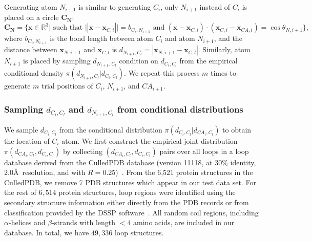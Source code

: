 Generating atom $N_{i+1}$ is similar to generating $C_i$, only
$N_{i+1}$ instead of $C_i$ is placed on a circle $\mathbf{C_N}$:
\begin{equation}
\label{eqn:circle-N} \mathbf{C_N} = \{\mathbf{x} \in \mathbb{R}^3 |
\mbox{ such that }||\mathbf{x} - \mathbf{x}_{C, i}|| =
b_{C_i,N_{i+1}} \mbox{ and } (\mathbf{x} - \mathbf{x}_{C, i}) \cdot
(\mathbf{x}_{C, i} - \mathbf{x}_{CA,i}) = \cos \theta_{N,i+1} \},
\end{equation}
where $b_{C_i,N_{i+1}}$ is the bond length between atom $C_i$ and
atom $N_{i+1}$, and the distance between $\mathbf{x}_{N,i+1}$ and
$\mathbf{x}_{C,l}$ is $d_{N_{i+1}, C_l} = | \mathbf{x}_{N,i+1} -
\mathbf{x}_{C,l}|$. Similarly, atom $N_{i+1}$ is placed by sampling
$d_{N_{i+1},\, C_l}$ condition on $ d_{C_i,C_l}$ from the empirical
conditional density $\pi(d_{N_{i+1},C_l} | d_{C_i, C_l})$. We repeat
this process $m$ times to generate $m$ trial positions of $C_i$,
$N_{i+1}$, and $CA_{i+1}$.


\subsubsection*{Sampling $d_{C_i,C_l}$ and $d_{N_{i+1},C_l}$ from conditional distributions}

We sample $d_{C_i,C_l}$ from the conditional distribution
$\pi(d_{C_i,C_l} | d_{CA_i,C_l})$ to obtain the location of $C_i$
atom. We first construct the empirical joint distribution
$\pi(d_{CA_i,C_l}, d_{C_i,C_l})$ by collecting $(d_{CA_i,C_l},
d_{C_i,C_l})$ pairs over all loops in a loop database derived from
the CulledPDB database (version 11118, at 30\% identity, 2.0\r{A}\
resolution, and with $R=0.25$)~\cite{wang2003}. From the 6,521
protein structures in the CulledPDB, we remove $7$ PDB structures
which appear in our test data set. For the rest of $6,514$ protein
structures, loop regions were identified using the secondary
structure information either directly from the PDB records or from
classification provided by the DSSP software~\cite{kabsch1983}. All
random coil regions, including $\alpha$-helices and $\beta$-strands
with length $<4$ amino acids, are included in our database. In
total, we have $49,336$ loop structures.

